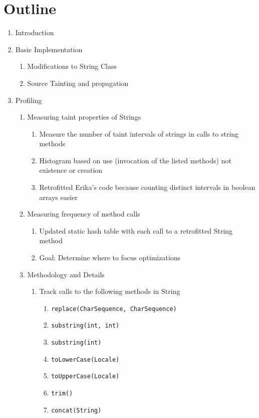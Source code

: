 \documentclass[times,11pt]{article}
\begin{document}
\section{Outline}
	\begin{enumerate}
	\item Introduction
	\item Basic Implementation
		\begin{enumerate}
		\item Modifications to String Class
		\item Source Tainting and propagation
		\end{enumerate}
	\item Profiling
		\begin{enumerate}
		\item Measuring taint properties of Strings
			\begin{enumerate}
			\item Measure the number of taint intervals of strings in calls to string methods
			\item Histogram based on use (invocation of the listed methods) not existence or creation
			\item Retrofitted Erika's code because counting distinct intervals in boolean arrays easier
			\end{enumerate}
		\item Measuring frequency of method calls
			\begin{enumerate}
			\item Updated static hash table with each call to a retrofitted String method
			\item Goal: Determine where to focus optimizations
			\end{enumerate}
		\item Methodology and Details
			\begin{enumerate}
			\item Track calls to the following methods in String
				\begin{enumerate}
				\item \texttt{replace(CharSequence, CharSequence)}
				\item \texttt{substring(int, int)}
				\item \texttt{substring(int)}
				\item \texttt{toLowerCase(Locale)}
				\item \texttt{toUpperCase(Locale)}
				\item \texttt{trim()}
				\item \texttt{concat(String)}

\end{enumerate}
\end{enumerate}
\end{enumerate}
\end{enumerate}
\end{document}
